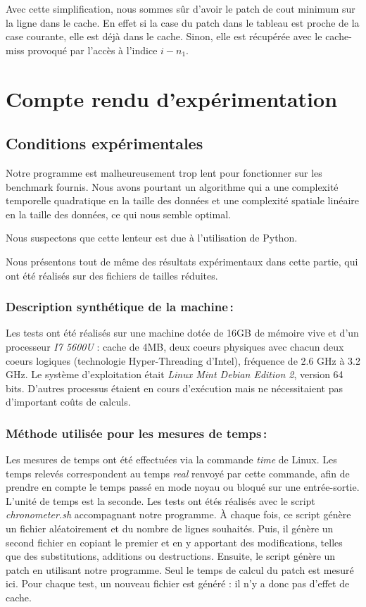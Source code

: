 \documentclass[a4paper, 10pt, french]{article}
\begin{document}
 	Avec cette simplification, nous sommes sûr d'avoir le patch de cout minimum sur la ligne dans le cache. En effet si la case du patch dans
 	le tableau est proche
 	de la case courante,  elle est déjà dans le cache. Sinon, elle est récupérée avec le cache-miss provoqué par l'accès à l'indice
 	$i - n_1$.

\section{Compte rendu d'expérimentation}
  \subsection{Conditions expérimentales}
    Notre programme est malheureusement trop lent pour fonctionner sur les benchmark fournis.
    Nous avons pourtant un algorithme qui a une complexité temporelle quadratique
    en la taille des données et une complexité spatiale linéaire en la taille des données,
    ce qui nous semble optimal.

    Nous suspectons que cette lenteur est due à l'utilisation de Python.

    Nous présentons tout de même des résultats expérimentaux dans cette partie,
    qui ont été réalisés sur des fichiers de tailles réduites.

    \subsubsection{Description synthétique de la machine\,:}
      Les tests ont été réalisés sur une machine dotée de 16GB de mémoire vive et
      d'un processeur \emph{I7 5600U} : cache de 4MB, deux coeurs physiques avec
      chacun deux coeurs logiques (technologie Hyper-Threading d'Intel), fréquence
      de 2.6 GHz à 3.2 GHz.
      Le système d'exploitation était \emph{Linux Mint Debian Edition 2}, version 64 bits.
      D'autres processus étaient en cours d'exécution mais ne nécessitaient pas
      d'important coûts de calculs.

    \subsubsection{Méthode utilisée pour les mesures de temps\,: }
      Les mesures de temps ont été effectuées via la commande \emph{time} de Linux.
      Les temps relevés correspondent au temps \emph{real} renvoyé par cette commande,
      afin de prendre en compte le temps passé en mode noyau ou bloqué sur une
      entrée-sortie.
      L'unité de temps est la seconde.
      Les tests ont étés réalisés avec le script \emph{chronometer.sh} accompagnant
      notre programme. À chaque fois, ce script génère un fichier aléatoirement et
      du nombre de lignes souhaités. Puis, il génère un second fichier en copiant
      le premier et en y apportant des modifications, telles que des substitutions,
      additions ou destructions. Ensuite, le script génère un patch en utilisant
      notre programme. Seul le temps de calcul du patch est mesuré ici.
      Pour chaque test, un nouveau fichier est généré : il n'y a donc pas d'effet
      de cache.
\end{document}
